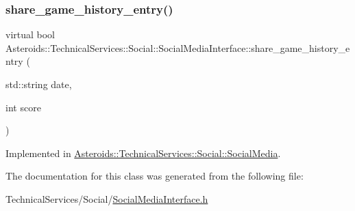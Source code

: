 \subsubsection{\texorpdfstring{share\+\_\+game\+\_\+history\+\_\+entry()}{share\_game\_history\_entry()}}
{\footnotesize\ttfamily virtual bool Asteroids\+::\+Technical\+Services\+::\+Social\+::\+Social\+Media\+Interface\+::share\+\_\+game\+\_\+history\+\_\+entry (\begin{DoxyParamCaption}\item[{std\+::string}]{date,  }\item[{int}]{score }\end{DoxyParamCaption})\hspace{0.3cm}{\ttfamily [pure virtual]}}



Implemented in \hyperlink{classAsteroids_1_1TechnicalServices_1_1Social_1_1SocialMedia_a0e9a33f41160db444c951015be441588}{Asteroids\+::\+Technical\+Services\+::\+Social\+::\+Social\+Media}.



The documentation for this class was generated from the following file\+:\begin{DoxyCompactItemize}
\item 
Technical\+Services/\+Social/\hyperlink{SocialMediaInterface_8h}{Social\+Media\+Interface.\+h}\end{DoxyCompactItemize}
